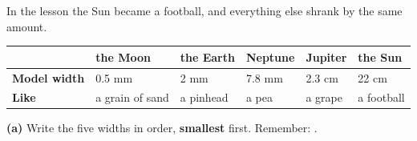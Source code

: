 \documentclass[12pt,a4paper]{article}
\newif\iffr
\newcommand{\fr}[1]{\unskip\iffr\par\vspace{1pt}\noindent{\small\itshape\color{black!60}#1}\par\fi}
\newcommand{\ansline}[1][4.4cm]{\par\nobreak\vspace{2pt}\hspace*{\fill}\blank[#1]\par}
\newcommand{\frl}[2]{\iffr#2\else#1\fi}
\begin{document}
\iffr\clearpage\fi
{}

\noindent\begin{minipage}{\textwidth}
In the lesson the Sun became a football, and everything else shrank by the same
amount.
\fr{En classe, le Soleil est devenu un ballon de foot, et tout le reste a \'et\'e
r\'eduit de la m\^eme fa\c{c}on.}

\vspace{3pt}
{\centering
\setlength{\tabcolsep}{5pt}%
\renewcommand{\arraystretch}{\frl{1.25}{1.45}}%
\begin{tabular}{|l|*{5}{C{2.3cm}|}}
  \hline
  & \textbf{the Moon} & \textbf{the Earth} & \textbf{Neptune} & \textbf{Jupiter} &
  \textbf{the Sun} \\ \hline
  \textbf{Model width} & 0.5 mm & 2 mm & 7.8 mm & 2.3 cm & 22 cm \\ \hline
  \textbf{Like} & \footnotesize a grain of sand & \small a pinhead & \small a pea
  & \small a grape & \small a football \\ \hline
\end{tabular}\par}

\vspace{5pt}
\noindent\textbf{(a)} Write the five widths in order, \textbf{smallest} first.
Remember: \mbox{\key{1 cm = 10 mm}}.
\fr{(a) Range les cinq largeurs dans l'ordre croissant, de la plus petite \`a la
plus grande (\eng{smallest first}~; 1 cm = 10 mm).}
\ansline[11.0cm]
\end{minipage}
\end{document}
